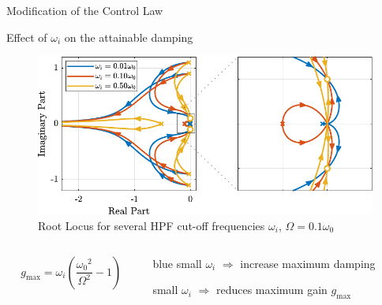 \documentclass[t, minted]{clean-beamer}
\begin{document}
\begin{frame}[label={sec:org2020343}]{Modification of the Control Law}
\begin{minipage}[b]{0.5\linewidth}
\begin{center}
\end{center}
\end{minipage}
\end{frame}


\begin{frame}[label={sec:org38b9bd2}]{Effect of \(\omega_i\) on the attainable damping}
\begin{figure}[htbp]
\centering
\includegraphics[width=\linewidth]{figs/root_locus_wi_modified_iff.pdf}
\caption{Root Locus for several HPF cut-off frequencies \(\omega_i\), \(\Omega = 0.1 \omega_0\)}
\end{figure}

\vspace{-2em}

\begin{columns}
\begin{column}{0.3\columnwidth}
\begin{equation*}
  g_{\text{max}} = \omega_i \left( \frac{{\omega_0}^2}{\Omega^2} - 1 \right)
\end{equation*}
\end{column}

\begin{column}{0.7\columnwidth}
\begin{cbox}[]{blue}{}
small \(\omega_i\) \(\Longrightarrow\) increase maximum damping

small \(\omega_i\) \(\Longrightarrow\) reduces maximum gain \(g_\text{max}\)
\end{cbox}
\end{column}
\end{columns}
\end{frame}
\end{document}
